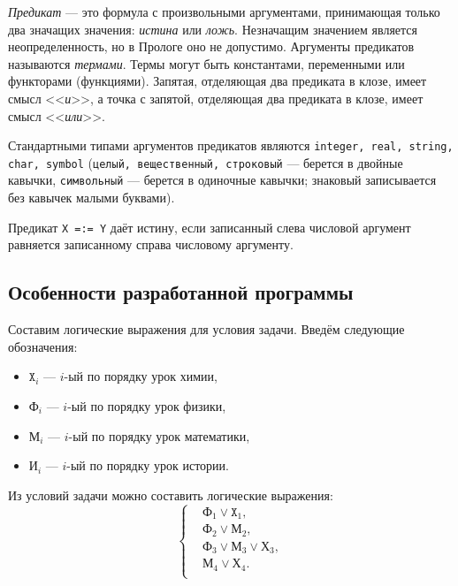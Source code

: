 \textit{Предикат} --- это формула с произвольными аргументами, принимающая
только два  значащих значения: \textit{истина} или \textit{ложь}.
Незначащим значением является неопределенность, но в Прологе оно не допустимо.
Аргументы предикатов называются \textit{термами}. Термы могут быть константами,
переменными или функторами (функциями).
Запятая, отделяющая два предиката в клозе, имеет смысл <<\textit{и}>>,
а точка с запятой, отделяющая два предиката в клозе, имеет смысл <<\textit{или}>>.

Стандартными типами аргументов предикатов являются
\texttt{integer, real, string, char, symbol} (\texttt{целый, вещественный,
строковый} --- берется в двойные кавычки,
\texttt{символьный} --- берется в одиночные кавычки;
знаковый записывается без кавычек малыми буквами).

Предикат \texttt{X =:= Y} даёт истину, если записанный слева числовой аргумент равняется
записанному справа числовому аргументу.


\subsection{Особенности разработанной программы}

Составим логические выражения для условия задачи. Введём следующие обозначения:

\begin{itemize}
  \item $\texttt{X}_{i}$ --- $i$-ый по порядку урок химии,
  \item $\texttt{Ф}_{i}$ --- $i$-ый по порядку урок физики,
  \item $\texttt{М}_{i}$ --- $i$-ый по порядку урок математики,
  \item $\texttt{И}_{i}$ --- $i$-ый по порядку урок истории.
\end{itemize}

Из условий задачи можно составить логические выражения:
\begin{equation*}
  \left\{
    \begin{aligned}
      &\texttt{Ф}_1 \lor \texttt{X}_1, \\
      &\texttt{Ф}_2 \lor \texttt{М}_2, \\
      &\texttt{Ф}_3 \lor \texttt{М}_3 \lor \texttt{Х}_3, \\
      &\texttt{М}_4 \lor \texttt{Х}_4. \\
    \end{aligned}
  \right.
\end{equation*}

